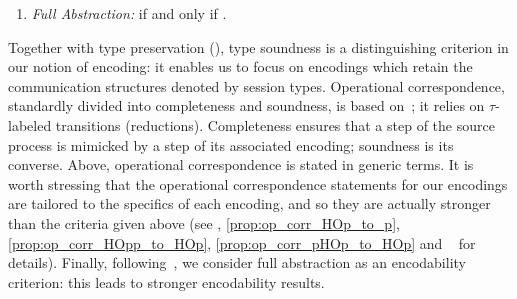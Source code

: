 \documentclass[runningheads]{llncs}
\begin{document}
{\begin{definition}
\begin{enumerate}[1.]
\begin{enumerate}
		\end{enumerate}
		
		\item \emph{Full Abstraction:} 
		if and only if 
		.
		
	\end{enumerate}
\end{definition}

\smallskip 

\noi Together with type preservation (), type soundness is a distinguishing criterion in our notion of encoding: it enables us to focus on encodings which retain the communication structures denoted by session types.
Operational correspondence, standardly divided into completeness and soundness, is based
on~\cite{DBLP:journals/iandc/Gorla10,DBLP:conf/icalp/LanesePSS10};
it relies on 
$\tau$-labeled transitions (reductions).
Completeness ensures that a step of the source process is mimicked
by a step of its associated encoding; soundness is its converse.
{Above, operational correspondence is stated in generic terms.}
It is worth stressing that 
the operational correspondence statements 
for our encodings 
 are tailored to the specifics of each encoding, and so they
 are actually stronger than the criteria given above
 {(see , \ref{prop:op_corr_HOp_to_p}, \ref{prop:op_corr_HOpp_to_HOp}, \ref{prop:op_corr_pHOp_to_HOp}
 and ~\cite{KouzapasPY15} for details).}
Finally, following~\cite{SangiorgiD:expmpa,DBLP:conf/lics/PalamidessiSVV06,Yoshida96},
we consider full abstraction as an encodability criterion: this leads to 
stronger encodability results. 

}
\end{document}
